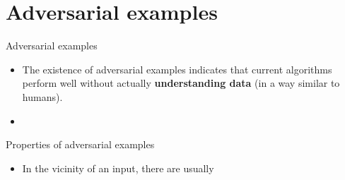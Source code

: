 \documentclass{beamer}
\begin{document}
\section{Adversarial examples}

\begin{frame}{Adversarial examples}
\begin{itemize}
	\item The existence of adversarial examples indicates that current algorithms perform well without actually \textbf{understanding data} (in a way similar to humans).
	\item 
\end{itemize}
\end{frame}

\begin{frame}{Properties of adversarial examples}
\begin{itemize}
    \item In the vicinity of an input, there are usually 
\end{itemize}
\end{frame}

\end{document}
